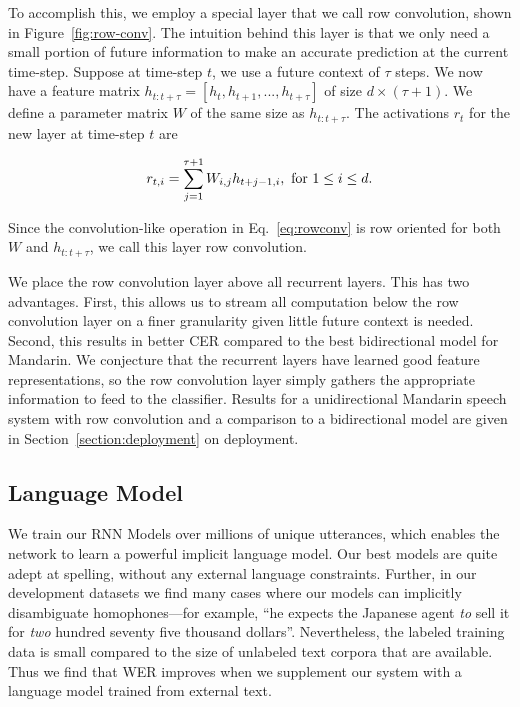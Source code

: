 \documentclass{article}
\begin{document}
To accomplish this, we employ a special layer that we call row convolution, shown in Figure~\ref{fig:row-conv}. The intuition behind this layer is that we only need a small portion of future information to make an accurate prediction at the current time-step. Suppose at time-step $t$, we use a future context of $\tau$ steps. We now have a feature matrix $h_{t:t+\tau} = [h_t, h_{t+1}, ..., h_{t+\tau}]$ of size $d\times(\tau+1)$. We define a parameter matrix $W$ of the same size as $h_{t:t+\tau}$. The activations $r_t$ for the new layer at time-step $t$ are 

\begin{align}
\label{eq:rowconv}
r_{t,i} = \sum_{j=1}^{\tau+1} W_{i,j} h_{t+j-1, i}, {\rm \ for\ } 1 \leq i \leq d.
\end{align}

Since the convolution-like operation in Eq.~\ref{eq:rowconv} is row oriented for both $W$ and $h_{t:t+\tau}$, we call this layer row convolution.

We place the row convolution layer above all recurrent layers. This has two advantages. First, this allows us to stream all computation below the row convolution layer on a finer granularity given little future context is needed. Second, this results in better CER compared to the best bidirectional model for Mandarin. We conjecture that the recurrent layers have learned good feature representations, so the row convolution layer simply gathers the appropriate information to feed to the classifier. Results for a unidirectional Mandarin speech system with row convolution and a comparison to a bidirectional model are given in Section~\ref{section:deployment} on deployment. 

\subsection{Language Model}
\label{subsection:languagemodel}

We train our RNN Models over millions of unique utterances, which enables the network to learn a powerful implicit language model. Our best models are quite adept at spelling, without any external language constraints. Further, in our development datasets we find many cases where our models can implicitly disambiguate homophones---for example, ``he expects the Japanese agent \emph{to} sell it for \emph{two} hundred seventy five thousand dollars''. Nevertheless, the labeled training data is small compared to the size of unlabeled text corpora that are available. Thus we find that WER improves when we supplement our system with a language model trained from external text. 
\end{document}
